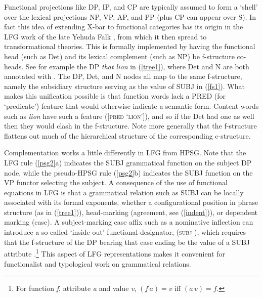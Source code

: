 Functional projections like DP, IP, and CP are typically assumed to form a `shell' over the lexical projections NP, VP, AP, and PP (plus CP can appear over S).  In fact this idea of extending X-bar to functional categories has its origin in the LFG work of the late Yehuda Falk \citep{Falk84a-u}, from which it then spread to  transformational theories.   This is formally implemented by having the functional head (such as Det) and its lexical complement (such as NP) be f-structure co-heads.  See for example the DP \textit{that lion} in (\ref{tree1}), where Det and N are both annotated with \updown .  The DP, Det, and N nodes all map to the same f-structure, namely the subsidiary structure serving as the value of SUBJ in (\ref{fs1}).  What makes this unification possible is that function words lack a PRED (for `predicate') feature that would otherwise indicate a semantic form.  Content words such as \textit{lion} have such a feature ([\textsc{pred} `\textsc{lion}']), and so if the Det had one as well then they would clash in the f-structure.  Note more generally that the f-structure flattens out much of the hierarchical structure of the corresponding c-structure.  



Complementation works a little differently in LFG from HPSG.  Note that the LFG  rule (\ref{psg2}a) indicates the SUBJ grammatical function on the subject DP node, while the pseudo-HPSG rule (\ref{psg2}b) indicates the SUBJ function on the VP functor selecting the subject.   A consequence of the use of functional equations in LFG is that a grammatical relation such as SUBJ can be locally associated with its formal exponents, whether a configurational position in phrase structure (as in (\ref{tree1})), head-marking (agreement, see (\ref{indent})), or dependent marking (case).  A subject-marking case affix such as a nominative inflection can introduce a so-called `inside out' functional designator, (\textsc{subj} \up), which requires that the f-structure of the DP bearing that case ending be the value of a SUBJ attribute \citep{Nordlinger98a-u}.\footnote{For function \textit{f}, attribute \textit{a} and value \textit{v}, $(f \, a) = v$ iff $(a \, v) = f$.}  This aspect of LFG representations makes it convenient for functionalist and typological work on grammatical relations.  


 
